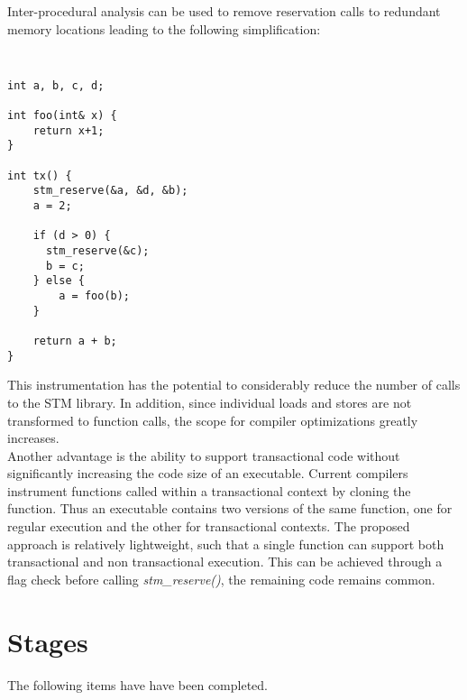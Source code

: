 \documentclass[letterpaper,twocolumn,10pt]{article}
\begin{document}
\noindent
Inter-procedural analysis can be used to remove reservation calls to redundant memory locations leading to the following simplification:

{\tt \small
\begin{verbatim}
int a, b, c, d;

int foo(int& x) {
    return x+1;
}

int tx() {
    stm_reserve(&a, &d, &b);
    a = 2;

    if (d > 0) {
      stm_reserve(&c);
      b = c;
    } else {
        a = foo(b);
    }

    return a + b;
}
\end{verbatim}
}

\noindent
This instrumentation has the potential to considerably reduce the number of  calls to the STM library. In addition, since individual loads and stores are not transformed to function calls, the scope for compiler optimizations greatly increases.\\

Another advantage is the ability to support transactional code without significantly increasing the code size of an executable. Current compilers instrument functions called within a transactional context by cloning the function. Thus an executable contains two versions of the same function, one for regular execution and the other for transactional contexts. The proposed approach is relatively lightweight, such that a single function can support both transactional and non transactional execution. This can be achieved through a flag check before calling \emph{stm\_reserve()}, the remaining code remains common.\\

\section{Stages}

The following items have have been completed.
\end{document}
